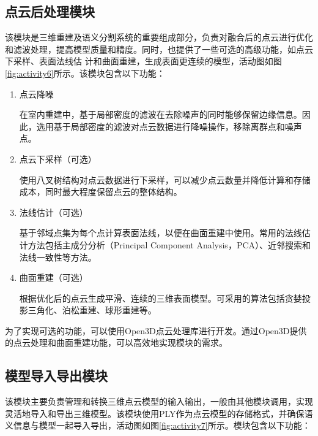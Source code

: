 \subsection{点云后处理模块}
\par 该模块是三维重建及语义分割系统的重要组成部分，负责对融合后的点云进行优化和滤波处理，提高模型质量和精度。同时，也提供了一些可选的高级功能，如点云下采样、表面法线估
计和曲面重建，生成表面更连续的模型，活动图如图\ref{fig:activity6}所示。该模块包含以下功能：
\begin{enumerate}
	\item{点云降噪}
	\par 在室内重建中，基于局部密度的滤波在去除噪声的同时能够保留边缘信息。因此，选用基于局部密度的滤波对点云数据进行降噪操作，移除离群点和噪声点。

	\item{点云下采样（可选）}
	\par 使用八叉树结构对点云数据进行下采样，可以减少点云数量并降低计算和存储成本，同时最大程度保留点云的整体结构。

	\item{法线估计（可选）}
	\par 基于邻域点集为每个点计算表面法线，以便在曲面重建中使用。常用的法线估计方法包括主成分分析（Principal Component Analysis，PCA）、近邻搜索和法线一致性等方法。

	\item{曲面重建（可选）}
	\par 根据优化后的点云生成平滑、连续的三维表面模型。可采用的算法包括贪婪投影三角化、泊松重建、球形重建等。
\end{enumerate}

\par 为了实现可选的功能，可以使用Open3D点云处理库进行开发。通过Open3D提供的点云处理和曲面重建功能，可以高效地实现模块的需求。

\subsection{模型导入导出模块}
\par 该模块主要负责管理和转换三维点云模型的输入输出，一般由其他模块调用，实现灵活地导入和导出三维模型。该模块使用PLY作为点云模型的存储格式，并确保语义信息与模型一起导入导出，活动图如图\ref{fig:activity7}所示。模块包含以下功能：


